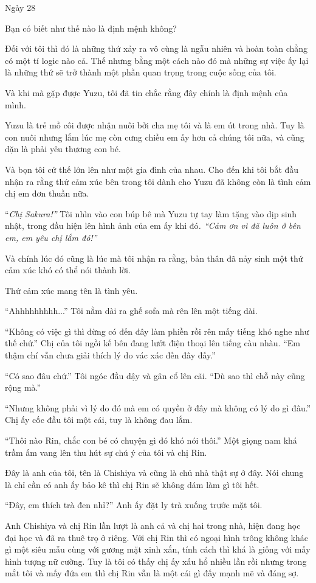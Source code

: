 {Ngày 28}
{
Bạn có biết như thế nào là định mệnh không?

Đối với tôi thì đó là những thứ xảy ra vô cùng là ngẫu nhiên và hoàn
toàn chẳng có một tí logic nào cả. Thế nhưng bằng một cách nào đó mà
những sự việc ấy lại là những thứ sẽ trở thành một phần quan trọng trong
cuộc sống của tôi.

Và khi mà gặp được Yuzu, tôi đã tin chắc rằng đây chính là định mệnh của
mình.

Yuzu là trẻ mồ côi được nhận nuôi bởi cha mẹ tôi và là em út trong nhà.
Tuy là con nuôi nhưng lắm lúc mẹ còn cưng chiều em ấy hơn cả chúng tôi
nữa, và cũng dặn là phải yêu thương con bé.

Và bọn tôi cứ thế lớn lên như một gia đình của nhau. Cho đến khi tôi bắt
đầu nhận ra rằng thứ cảm xúc bên trong tôi dành cho Yuzu đã không còn là
tình cảm chị em đơn thuần nữa.

``\emph{Chị Sakura!''} Tôi nhìn vào con búp bê mà Yuzu tự tay làm tặng
vào dịp sinh nhật, trong đầu hiện lên hình ảnh của em ấy khi đó\emph{.
``Cảm ơn vì đã luôn ở bên em, em yêu chị lắm đó!''}

Và chính lúc đó cũng là lúc mà tôi nhận ra rằng, bản thân đã nảy sinh
một thứ cảm xúc khó có thể nói thành lời.

Thứ cảm xúc mang tên là tình yêu.

``Ahhhhhhhhh...'' Tôi nằm dài ra ghế sofa mà rên lên một tiếng dài.

``Không có việc gì thì đừng có đến đây làm phiền rồi rên mấy tiếng khó
nghe như thế chứ.'' Chị của tôi ngồi kế bên đang lướt điện thoại lên
tiếng càu nhàu. ``Em thậm chí vẫn chưa giải thích lý do vác xác đến đây
đấy.''

``Có sao đâu chứ.'' Tôi ngóc đầu dậy và gân cổ lên cãi. ``Dù sao thì chỗ
này cũng rộng mà.''

``Nhưng không phải vì lý do đó mà em có quyền ở đây mà không có lý do gì
đâu.'' Chị ấy cốc đầu tôi một cái, tuy là không đau lắm.

``Thôi nào Rin, chắc con bé có chuyện gì đó khó nói thôi.'' Một giọng
nam khá trầm ấm vang lên thu hút sự chú ý của tôi và chị Rin.

Đây là anh của tôi, tên là Chishiya và cũng là chủ nhà thật sự ở đây.
Nói chung là chỉ cần có anh ấy bảo kê thì chị Rin sẽ không dám làm gì
tôi hết.

``Đây, em thích trà đen nhỉ?'' Anh ấy đặt ly trà xuống trước mặt tôi.

Anh Chishiya và chị Rin lần lượt là anh cả và chị hai trong nhà, hiện
đang học đại học và đã ra thuê trọ ở riêng. Với chị Rin thì có ngoại
hình trông không khác gì một siêu mẫu cùng với gương mặt xinh xắn, tính
cách thì khá là giống với mấy hình tượng nữ cường. Tuy là tôi có thấy
chị ấy xấu hổ nhiều lần rồi nhưng trong mắt tôi và mấy đứa em thì chị
Rin vẫn là một cái gì đấy mạnh mẽ và đáng sợ.

}
